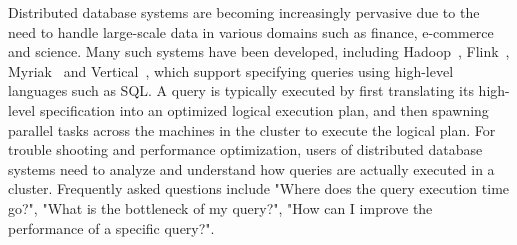 



Distributed database systems are becoming increasingly pervasive due to the need to handle large-scale data in various domains such as finance, e-commerce and science. Many such systems have been developed, including Hadoop~\cite{hadoop}, Flink~\cite{carbone2015apache}, Myriak~\cite{} and Vertical~\cite{}, which support specifying queries using high-level languages such as SQL. A query is typically executed by first translating its high-level specification into an optimized logical execution plan, and then spawning parallel tasks across the machines in the cluster to execute the logical plan. For trouble shooting and performance optimization, users of distributed database systems need to analyze and understand how queries are actually executed in a cluster. Frequently asked questions include "Where does the query execution time go?", "What is the bottleneck of my query?", "How can I improve the performance of a specific query?".    







